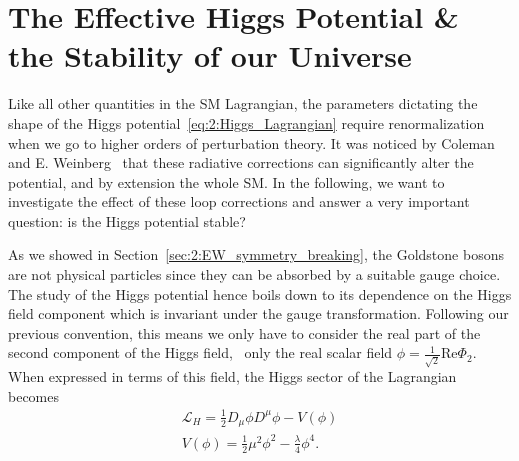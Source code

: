 
\chapter{The Effective Higgs Potential \& the Stability of our Universe} \label{chap:3:effective_higgs_potential}

Like all other quantities in the \acs{SM} Lagrangian, the parameters dictating the shape of the Higgs potential~\eqref{eq:2:Higgs_Lagrangian} require renormalization when we go to higher orders of perturbation theory. It was noticed by Coleman and E. Weinberg~\cite{Coleman:1973jx} that these radiative corrections can significantly alter the potential, and by extension the whole \acs{SM}. In the following, we want to investigate the effect of these loop corrections and answer a very important question: is the Higgs potential stable?

As we showed in Section~\ref{sec:2:EW_symmetry_breaking}, the Goldstone bosons are not physical particles since they can be absorbed by a suitable gauge choice. The study of the Higgs potential hence boils down to its dependence on the Higgs field component which is invariant under the gauge transformation. Following our previous convention, this means we only have to consider the real part of the second component of the Higgs field, \ie\ only the real scalar field $\phi = \frac{1}{\sqrt{2}} \text{Re} \Phi_2$. When expressed in terms of this field, the Higgs sector of the Lagrangian becomes
\begin{equation}
\begin{gathered}
\mathcal{L}_H = \frac{1}{2} D_\mu \phi D^\mu \phi - V(\phi) \\
V(\phi) =  \frac{1}{2} \mu^2 \phi^2 - \frac{\lambda}{4} \phi^4.
\end{gathered}
\label{eq:3:Lagrangian_phi}
\end{equation}

